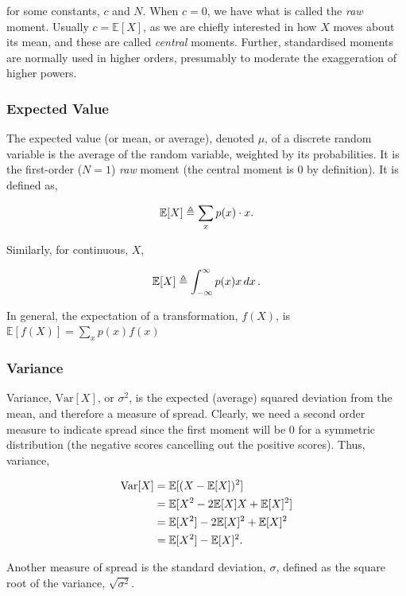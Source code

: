 \documentclass[11pt]{amsart}
\begin{document}
for some constants, $c$ and $N$. When $c = 0$, we have what is called the \emph{raw} moment. Usually $c = \mathbb{E}[X]$, as we are chiefly interested in how $X$ moves about its mean, and these are called \emph{central} moments. Further, standardised moments are normally used in higher orders, presumably to moderate the exaggeration of higher powers.

\subsubsection{Expected Value}

The expected value (or mean, or average), denoted $\mu$, of a discrete random variable is the average of the random variable, weighted by its probabilities. It is the first-order ($N=1$) \emph{raw} moment (the central moment is 0 by definition). It is defined as,

$$
\mathbb{E}[X] \triangleq \sum_{x} p(x)\cdot x.\\
$$

Similarly, for continuous, $X$,

$$
\mathbb{E}[X] \triangleq \int_{-\infty}^{\infty} p(x) x \mathop{dx}.\\
$$ 

In general, the expectation of a transformation, $f(X)$, is $\mathbb{E}[f(X)] = \sum_x p(x)f(x)$

\subsubsection{Variance}

Variance, $\text{Var}[X]$, or $\sigma^2$, is the expected (average) squared deviation from the mean, and therefore a measure of spread. Clearly, we need a second order measure to indicate spread since the first moment will be 0 for a symmetric distribution (the negative scores cancelling out the positive scores). Thus, variance,

\begin{align}
\text{Var}[X] &= \mathbb{E}[(X - \mathbb{E}[X])^2] \notag \\
&= \mathbb{E}[X^2 - 2\mathbb{E}[X]X + \mathbb{E}[X]^2] \notag \\
&= \mathbb{E}[X^2] - 2\mathbb{E}[X]^2 + \mathbb{E}[X]^2 \notag \\
&= \mathbb{E}[X^2] - \mathbb{E}[X]^2. \notag
\end{align}

Another measure of spread is the standard deviation, $\sigma$, defined as the square root of the variance, $\sqrt{\sigma^2}$.
\end{document}
